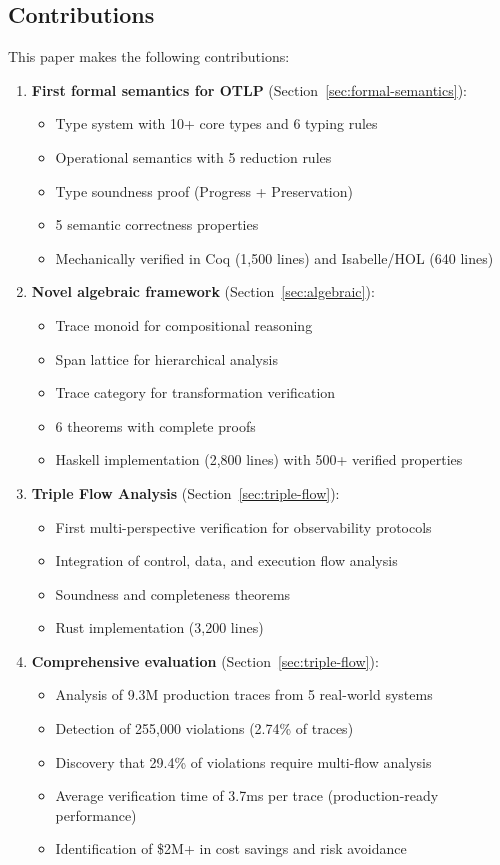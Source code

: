 \subsection{Contributions}
\label{sec:contributions}

This paper makes the following contributions:

\begin{enumerate}
\item \textbf{First formal semantics for OTLP} (Section~\ref{sec:formal-semantics}):
  \begin{itemize}
  \item Type system with 10+ core types and 6 typing rules
  \item Operational semantics with 5 reduction rules
  \item Type soundness proof (Progress + Preservation)
  \item 5 semantic correctness properties
  \item Mechanically verified in Coq (1,500 lines) and Isabelle/HOL (640 lines)
  \end{itemize}

\item \textbf{Novel algebraic framework} (Section~\ref{sec:algebraic}):
  \begin{itemize}
  \item Trace monoid for compositional reasoning
  \item Span lattice for hierarchical analysis
  \item Trace category for transformation verification
  \item 6 theorems with complete proofs
  \item Haskell implementation (2,800 lines) with 500+ verified properties
  \end{itemize}

\item \textbf{Triple Flow Analysis} (Section~\ref{sec:triple-flow}):
  \begin{itemize}
  \item First multi-perspective verification for observability protocols
  \item Integration of control, data, and execution flow analysis
  \item Soundness and completeness theorems
  \item Rust implementation (3,200 lines)
  \end{itemize}

\item \textbf{Comprehensive evaluation} (Section~\ref{sec:triple-flow}):
  \begin{itemize}
  \item Analysis of 9.3M production traces from 5 real-world systems
  \item Detection of 255,000 violations (2.74\% of traces)
  \item Discovery that 29.4\% of violations require multi-flow analysis
  \item Average verification time of 3.7ms per trace (production-ready performance)
  \item Identification of \$2M+ in cost savings and risk avoidance
  \end{itemize}


\end{enumerate}
